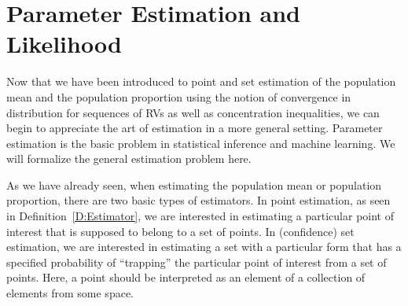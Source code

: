 \section{Parameter Estimation and Likelihood}\label{S:ParamEstAndLikelihood}

Now that we have been introduced to point and set estimation of the population mean and the population proportion using the notion of convergence in distribution for sequences of RVs as well as concentration inequalities, 
we can begin to appreciate the art of estimation in a more general setting.  
Parameter estimation is the basic problem in statistical inference and machine learning.  
We will formalize the general estimation problem here.  

As we have already seen, when estimating the population mean or population proportion, there are two basic types of estimators.  
In point estimation, as seen in Definition~\ref{D:Estimator}, we are interested in estimating a particular point of interest that is supposed to belong to a set of points.  
In (confidence) set estimation, we are interested in estimating a set with a particular form that has a specified probability of ``trapping'' the particular point of interest from a set of points.  
Here, a point should be interpreted as an element of a collection of elements from some space.

